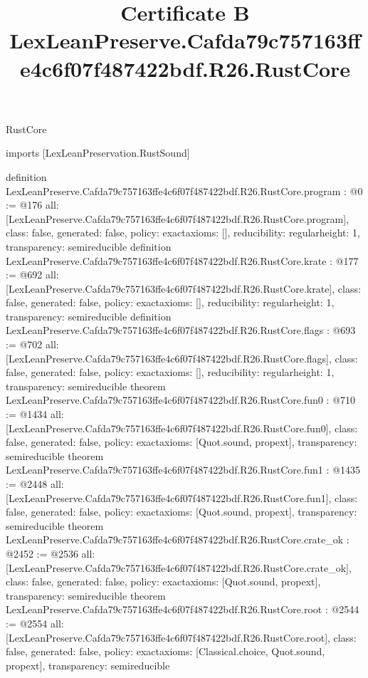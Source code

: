 \begin{lexlean}{RustCore}
\title{Certificate B LexLeanPreserve.Cafda79c757163ffe4c6f07f487422bdf.R26.RustCore}
\begin{coremodule}
imports [LexLeanPreservation.RustSound]

definition LexLeanPreserve.Cafda79c757163ffe4c6f07f487422bdf.R26.RustCore.program : @0 := @176 {
  all: [LexLeanPreserve.Cafda79c757163ffe4c6f07f487422bdf.R26.RustCore.program],
  class: false,
  generated: false,
  policy: exact{axioms: []},
  reducibility: regular{height: 1},
  transparency: semireducible
}
definition LexLeanPreserve.Cafda79c757163ffe4c6f07f487422bdf.R26.RustCore.krate : @177 := @692 {
  all: [LexLeanPreserve.Cafda79c757163ffe4c6f07f487422bdf.R26.RustCore.krate],
  class: false,
  generated: false,
  policy: exact{axioms: []},
  reducibility: regular{height: 1},
  transparency: semireducible
}
definition LexLeanPreserve.Cafda79c757163ffe4c6f07f487422bdf.R26.RustCore.flags : @693 := @702 {
  all: [LexLeanPreserve.Cafda79c757163ffe4c6f07f487422bdf.R26.RustCore.flags],
  class: false,
  generated: false,
  policy: exact{axioms: []},
  reducibility: regular{height: 1},
  transparency: semireducible
}
theorem LexLeanPreserve.Cafda79c757163ffe4c6f07f487422bdf.R26.RustCore.fun0 : @710 := @1434 {
  all: [LexLeanPreserve.Cafda79c757163ffe4c6f07f487422bdf.R26.RustCore.fun0],
  class: false,
  generated: false,
  policy: exact{axioms: [Quot.sound, propext]},
  transparency: semireducible
}
theorem LexLeanPreserve.Cafda79c757163ffe4c6f07f487422bdf.R26.RustCore.fun1 : @1435 := @2448 {
  all: [LexLeanPreserve.Cafda79c757163ffe4c6f07f487422bdf.R26.RustCore.fun1],
  class: false,
  generated: false,
  policy: exact{axioms: [Quot.sound, propext]},
  transparency: semireducible
}
theorem LexLeanPreserve.Cafda79c757163ffe4c6f07f487422bdf.R26.RustCore.crate_ok : @2452 := @2536 {
  all: [LexLeanPreserve.Cafda79c757163ffe4c6f07f487422bdf.R26.RustCore.crate_ok],
  class: false,
  generated: false,
  policy: exact{axioms: [Quot.sound, propext]},
  transparency: semireducible
}
theorem LexLeanPreserve.Cafda79c757163ffe4c6f07f487422bdf.R26.RustCore.root : @2544 := @2554 {
  all: [LexLeanPreserve.Cafda79c757163ffe4c6f07f487422bdf.R26.RustCore.root],
  class: false,
  generated: false,
  policy: exact{axioms: [Classical.choice, Quot.sound, propext]},
  transparency: semireducible
}


\end{coremodule}
\end{lexlean}
